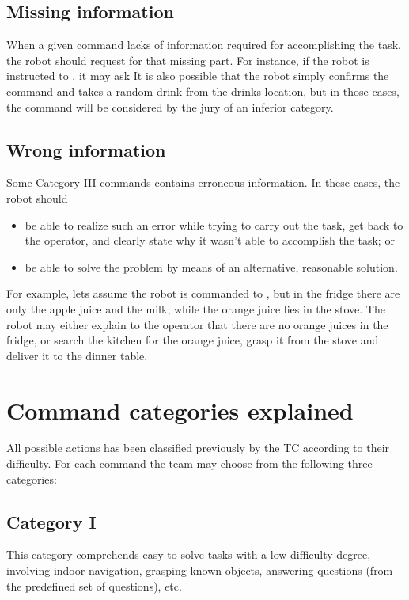 \subsection{Missing information}
When a given command lacks of information required for accomplishing the task, the robot should request for that missing part. For instance, if the robot is instructed to \textit{}, it may ask \textit{} It is also possible that the robot simply confirms the command and takes a random drink from the drinks location, but in those cases, the command will be considered by the jury of an inferior category.

\subsection{Wrong information}
Some Category III commands contains erroneous information. In these cases, the robot should
\begin{itemize}
	\item be able to realize such an error while trying to carry out the task, get back to the operator, and clearly state why it wasn't able to accomplish the task; or
	\item be able to solve the problem by means of an alternative, reasonable solution.
\end{itemize}

For example, lets assume the robot is commanded to \textit{}, but in the fridge there are only the apple juice and the milk, while the orange juice lies in the stove. The robot may either explain to the operator that there are no orange juices in the fridge, or search the kitchen for the orange juice, grasp it from the stove and deliver it to the dinner table.

\section{Command categories explained}
All possible actions has been classified previously by the TC according to their difficulty. For each command the team may choose from the following three categories:

\subsection{Category I}
This category comprehends easy-to-solve tasks with a low difficulty degree, involving indoor navigation, grasping known objects, answering questions (from the predefined set of questions), etc.

